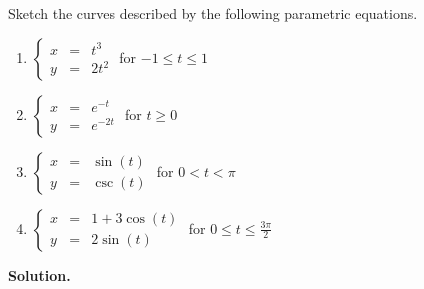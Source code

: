 \begin{ex} \label{parametrictorect}  Sketch the curves described by the following parametric equations.  

\begin{multicols}{2}

\begin{enumerate}

\item  $\left\{ \begin{array}{rcl} x & = & t^3 \\ y & = & 2t^2 \end{array} \right.$ for $-1 \leq t \leq 1$
\item  $\left\{ \begin{array}{rcl} x & = & e^{-t} \\ y & = & e^{-2t} \end{array} \right.$ for $t \geq 0$
\item \label{parametric1overx} $\left\{ \begin{array}{rcl} x & = & \sin(t) \\ y & = & \csc(t) \end{array} \right.$ for $0 < t < \pi$
\item  \label{parametricellipse} $\left\{ \begin{array}{rcl} x & = & 1 + 3\cos(t) \\ y & = & 2\sin(t) \end{array} \right.$ for $0 \leq t \leq \frac{3\pi}{2}$
  

\end{enumerate}

\end{multicols}

{\bf Solution.}

\begin{enumerate}


\end{enumerate}
\end{ex}
